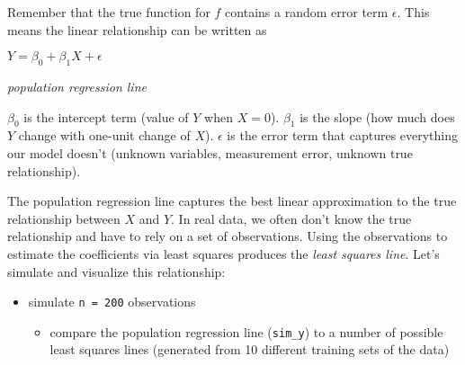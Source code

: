\documentclass[]{book}
\providecommand{\tightlist}{%
  \setlength{\itemsep}{0pt}\setlength{\parskip}{0pt}}
\begin{document}
Remember that the true function for \(f\) contains a random error term \(\epsilon\). This means the linear relationship can be written as

\(Y = \beta_0 + \beta_1X + \epsilon\)

\emph{population regression line}

\(\beta_0\) is the intercept term (value of \(Y\) when \(X = 0\)). \(\beta_1\) is the slope (how much does \(Y\) change with one-unit change of \(X\)). \(\epsilon\) is the error term that captures everything our model doesn't (unknown variables, measurement error, unknown true relationship).

The population regression line captures the best linear approximation to the true relationship between \(X\) and \(Y\). In real data, we often don't know the true relationship and have to rely on a set of observations. Using the observations to estimate the coefficients via least squares produces the \emph{least squares line}. Let's simulate and visualize this relationship:

\begin{itemize}
\tightlist
\item
  simulate \texttt{n\ =\ 200} observations

  \begin{itemize}
  \tightlist
  \item
    compare the population regression line (\texttt{sim\_y}) to a number of possible least squares lines (generated from 10 different training sets of the data)
  \end{itemize}
\end{itemize}
\end{document}
